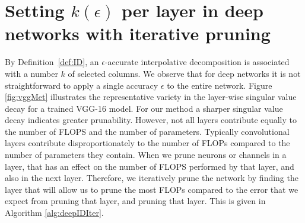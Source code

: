 %
%
 
\section{Setting $k(\epsilon)$ per layer in deep networks with iterative pruning}
\label{app:sec:iterativeID}
By Definition~\ref{def:ID}, an $\epsilon$-accurate interpolative decomposition is associated with a number $k$ of selected columns.
We observe that for deep networks it is not straightforward to apply a single accuracy $\epsilon$ to the entire network.
Figure \ref{fig:vggMet} illustrates the representative variety in the layer-wise singular value decay for a trained VGG-16 model.
For our method a sharper singular value decay indicates greater prunability. 
However, not all layers contribute equally to the number of FLOPS and the number of parameters.  Typically convolutional layers contribute disproportionately to the number of FLOPs compared to the number of parameters they contain.
When we prune neurons or channels in a layer, that has an effect on the number of FLOPS performed by that layer, and also in the next layer.  Therefore, we iteratively prune the network by finding the layer that will allow us to prune the most FLOPs compared to the error that we expect from pruning that layer, and pruning that layer.  This is given in Algorithm \ref{alg:deepIDIter}.  

